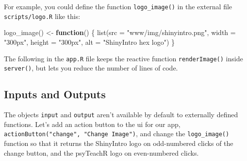 \documentclass[
]{book}
\newenvironment{Shaded}{\begin{snugshade}}{\end{snugshade}}
\newcommand{\AttributeTok}[1]{\textcolor[rgb]{0.77,0.63,0.00}{#1}}
\newcommand{\ConstantTok}[1]{\textcolor[rgb]{0.00,0.00,0.00}{#1}}
\newcommand{\ControlFlowTok}[1]{\textcolor[rgb]{0.13,0.29,0.53}{\textbf{#1}}}
\newcommand{\FunctionTok}[1]{\textcolor[rgb]{0.00,0.00,0.00}{#1}}
\newcommand{\NormalTok}[1]{#1}
\newcommand{\OtherTok}[1]{\textcolor[rgb]{0.56,0.35,0.01}{#1}}
\newcommand{\SpecialCharTok}[1]{\textcolor[rgb]{0.00,0.00,0.00}{#1}}
\newcommand{\StringTok}[1]{\textcolor[rgb]{0.31,0.60,0.02}{#1}}
\begin{document}
For example, you could define the function \texttt{logo\_image()} in the external file \texttt{scripts/logo.R} like this:

\begin{Shaded}
\begin{Highlighting}[]
\FunctionTok{logo\_image}\NormalTok{() }\OtherTok{\textless{}{-}} \ControlFlowTok{function}\NormalTok{() \{}
  \FunctionTok{list}\NormalTok{(}\AttributeTok{src =} \StringTok{"www/img/shinyintro.png"}\NormalTok{,}
       \AttributeTok{width =} \StringTok{"300px"}\NormalTok{,}
       \AttributeTok{height =} \StringTok{"300px"}\NormalTok{,}
       \AttributeTok{alt =} \StringTok{"ShinyIntro hex logo"}\NormalTok{)}
\NormalTok{\}}
\end{Highlighting}
\end{Shaded}

The following in the \texttt{app.R} file keeps the reactive function \texttt{renderImage()} inside \texttt{server()}, but lets you reduce the number of lines of code.

\begin{Shaded}
\end{Shaded}

\hypertarget{inputs-and-outputs}{%
\subsection{Inputs and Outputs}\label{inputs-and-outputs}}

The objects \texttt{input} and \texttt{output} aren't available by default to externally defined functions. Let's add an action button to the ui for our app, \texttt{actionButton("change",\ "Change\ Image")}, and change the \texttt{logo\_image()} function so that it returns the ShinyIntro logo on odd-numbered clicks of the change button, and the psyTeachR logo on even-numbered clicks.
\end{document}
